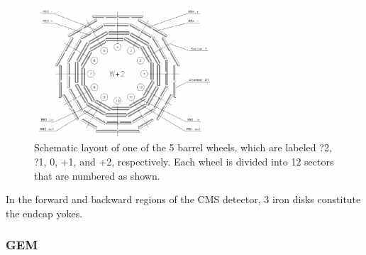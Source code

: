 \begin{figure}[h!]
\centering
\includegraphics[width=0.6\textwidth]{Images/RPC_B}
\caption{Schematic layout of one of the 5 barrel wheels, which are labeled ?2, ?1, 0, +1, and +2, respectively. Each wheel is divided into 12 sectors that are numbered as shown.}
\label{RPC_B}
\end{figure}
In the forward and backward regions of the CMS detector, 3 iron disks constitute the endcap yokes. 


\subsubsection{GEM}
 
